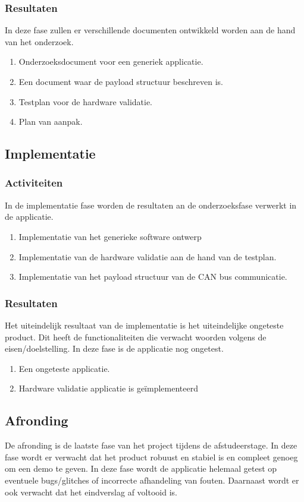 \subsubsection{Resultaten}
In deze fase zullen er verschillende documenten ontwikkeld worden aan de hand van het onderzoek.
\begin{enumerate}
	\item Onderzoeksdocument voor een generiek applicatie.
	\item Een document waar de payload structuur beschreven is.
	\item Testplan voor de hardware validatie.
	\item Plan van aanpak.
\end{enumerate}

\newpage
\subsection{Implementatie}
\subsubsection{Activiteiten}
In de implementatie fase worden de resultaten an de onderzoeksfase verwerkt in de applicatie. 
\begin{enumerate}
	\item Implementatie van het generieke software ontwerp
	\item Implementatie van de hardware validatie aan de hand van de testplan.
	\item Implementatie van het payload structuur van de CAN bus communicatie.
\end{enumerate}
	
\subsubsection{Resultaten}
Het uiteindelijk resultaat van de implementatie is het uiteindelijke ongeteste product. Dit heeft de functionaliteiten die verwacht woorden volgens de eisen/doelstelling. In deze fase is de applicatie nog ongetest.
\begin{enumerate}
	\item Een ongeteste applicatie.
	\item Hardware validatie applicatie is geïmplementeerd
\end{enumerate}

\subsection{Afronding}
De afronding is de laatste fase van het project tijdens de afstudeerstage. In deze fase wordt er verwacht dat het product robuust en stabiel is en compleet genoeg om een demo te geven. In deze fase wordt de applicatie helemaal getest op eventuele bugs/glitches of incorrecte afhandeling van fouten. Daarnaast wordt er ook verwacht dat het eindverslag af voltooid is.

